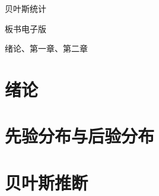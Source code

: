 \documentclass[UTF8,a4paper,11pt,openany]{ctexbook}
\begin{document}
\frontmatter
\begin{titlepage}
\centering\vspace*{36mm}
{\Huge 贝叶斯统计\par}\vspace{10mm}
{\LARGE 板书电子版\par}\vspace{18mm}
{\large 绪论、第一章、第二章\par}
\vfill
\end{titlepage}
\tableofcontents
\chapter*{绪论}

\mainmatter
\chapter{先验分布与后验分布}





\chapter{贝叶斯推断}






\backmatter

\end{document}
